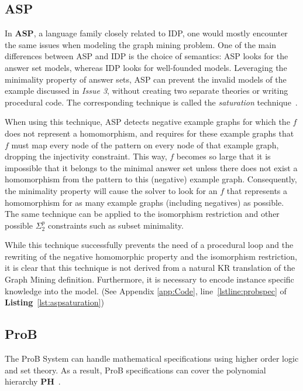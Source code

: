 \subsection{ASP}
In \textbf{ASP}, a language family closely related to IDP, one would mostly encounter the same issues when modeling the graph mining problem.
One of the main differences between ASP and IDP is the choice of semantics: ASP looks for the
answer set models, whereas IDP looks for well-founded models.
Leveraging the minimality property of answer sets, ASP can prevent the invalid models of the example discussed in \textit{Issue 3}, without creating two separate theories or writing procedural code.
The corresponding technique is called the \emph{saturation} technique~\citep{conf/rweb/EiterIK09}.

When using this technique, ASP detects negative example graphs for which the $f$ does not represent a homomorphism, and requires for these example graphs that $f$ must map every node of the pattern on every node of that example graph, dropping the injectivity constraint.
This way, $f$ becomes so large that it is impossible that it belongs to the minimal answer set unless there does not exist a homomorphism from the pattern to this (negative) example graph.
Consequently, the minimality property will cause the solver to look for an $f$ that represents a homomorphism for as many example graphs (including negatives) as possible.
The same technique can be applied to the isomorphism restriction and other possible $\Sigma_{2}^{p}$ constraints such as subset minimality.


While this technique successfully prevents the need of a procedural loop and the rewriting of the negative homomorphic property and the isomorphism restriction, it is clear that this technique is not derived from a natural KR translation of the Graph Mining definition.
Furthermore, it is necessary to encode instance specific knowledge into the model.
(See Appendix \ref{app:Code}, line~\ref{lstline:probspec} of \textbf{Listing}~\ref{lst:aspsaturation})

\subsection{ProB} \label{subsection:prob}
The ProB System can handle mathematical specifications using higher order logic and set theory.
As a result, ProB specifications can cover the polynomial hierarchy \textbf{PH}~\citep{DBLP:books/daglib/0095988}.


